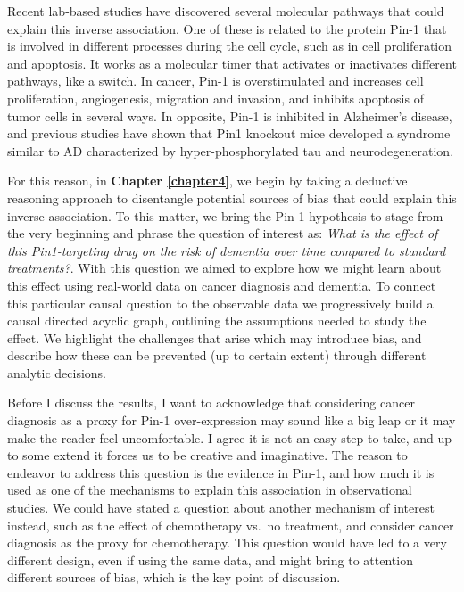 \documentclass[
]{book}
\begin{document}
Recent lab-based studies have discovered several molecular pathways that could explain this inverse association. One of these is related to the protein Pin-1 that is involved in different processes during the cell cycle, such as in cell proliferation and apoptosis. It works as a molecular timer that activates or inactivates different pathways, like a switch. In cancer, Pin-1 is overstimulated and increases cell proliferation, angiogenesis, migration and invasion, and inhibits apoptosis of tumor cells in several ways. In opposite, Pin-1 is inhibited in Alzheimer's disease, and previous studies have shown that Pin1 knockout mice developed a syndrome similar to AD characterized by hyper-phosphorylated tau and neurodegeneration\autocite{li2021,driverpin2015,driverbiogeront2014}.

For this reason, in \textbf{Chapter \ref{chapter4}}, we begin by taking a deductive reasoning approach to disentangle potential sources of bias that could explain this inverse association. To this matter, we bring the Pin-1 hypothesis to stage from the very beginning and phrase the question of interest as: \emph{What is the effect of this Pin1-targeting drug on the risk of dementia over time compared to standard treatments?}. With this question we aimed to explore how we might learn about this effect using real-world data on cancer diagnosis and dementia. To connect this particular causal question to the observable data we progressively build a causal directed acyclic graph, outlining the assumptions needed to study the effect. We highlight the challenges that arise which may introduce bias, and describe how these can be prevented (up to certain extent) through different analytic decisions.

Before I discuss the results, I want to acknowledge that considering cancer diagnosis as a proxy for Pin-1 over-expression may sound like a big leap or it may make the reader feel uncomfortable. I agree it is not an easy step to take, and up to some extend it forces us to be creative and imaginative. The reason to endeavor to address this question is the evidence in Pin-1, and how much it is used as one of the mechanisms to explain this association in observational studies. We could have stated a question about another mechanism of interest instead, such as the effect of chemotherapy vs.~no treatment, and consider cancer diagnosis as the proxy for chemotherapy. This question would have led to a very different design, even if using the same data, and might bring to attention different sources of bias, which is the key point of discussion.
\end{document}
